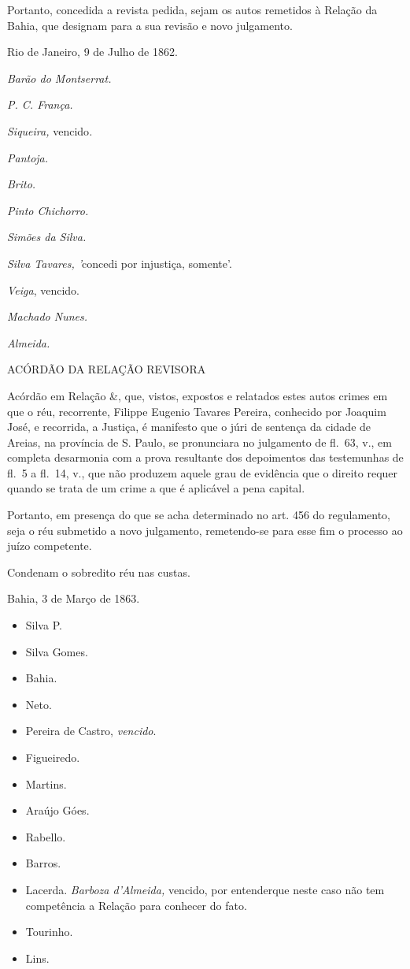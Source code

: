 Portanto, concedida a revista pedida, sejam os autos remetidos à Relação
da Bahia, que designam para a sua revisão e novo julgamento.

Rio de Janeiro, 9 de Julho de 1862.

\emph{Barão do Montserrat.}

\emph{P. C. França.}

\emph{Siqueira,} vencido\emph{.}

\emph{Pantoja.}

\emph{Brito.}

\emph{Pinto Chichorro.}

\emph{Simões da Silva.}

\emph{Silva Tavares, '}concedi por injustiça, somente'.

\emph{Veiga}, vencido.

\emph{Machado Nunes.}

\emph{Almeida.}

ACÓRDÃO DA RELAÇÃO REVISORA

Acórdão em Relação \&, que, vistos, expostos e relatados estes autos
crimes em que o réu, recorrente, Filippe Eugenio Tavares Pereira,
conhecido por Joaquim José, e recorrida, a Justiça, é manifesto que o
júri de sentença da cidade de Areias, na província de S. Paulo, se
pronunciara no julgamento de fl.~63, v., em completa desarmonia com a
prova resultante dos depoimentos das testemunhas de fl.~5 a fl.~14, v.,
que não produzem aquele grau de evidência que o direito requer quando se
trata de um crime a que é aplicável a pena capital.

Portanto, em presença do que se acha determinado no art. 456 do
regulamento, seja o réu submetido a novo julgamento, remetendo-se para
esse fim o processo ao juízo competente.

Condenam o sobredito réu nas custas.

Bahia, 3 de Março de 1863.

\begin{itemize}
\tightlist
\item
  Silva P.
\item
  Silva Gomes.
\item
  Bahia.
\item
  Neto.
\item
  Pereira de Castro, \emph{vencido}.
\item
  Figueiredo.
\item
  Martins.
\item
  Araújo Góes.
\item
  Rabello.
\item
  Barros.
\item
  Lacerda. \emph{Barboza d'Almeida,} vencido, por entenderque neste caso
  não tem competência a Relação para conhecer do fato.
\item
  Tourinho.
\item
  Lins.
\end{itemize}

